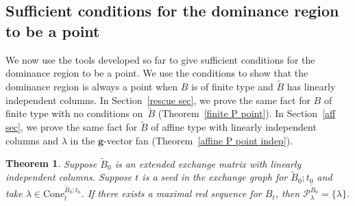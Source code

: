 \documentclass{amsart}
\newtheorem{theorem}[proposition]{Theorem}
\theoremstyle{definition}
\theoremstyle{remark}
\numberwithin{equation}{section}
\newcommand{\set}[1]{{\lbrace #1 \rbrace}}
\newcommand{\0}{{\mathbf{0}}}
\newcommand{\Cone}{\mathrm{Cone}}
\newcommand{\g}{\mathbf{g}}
\newcommand{\tB}{{\widetilde{B}}}
\renewcommand{\P}{\mathcal{P}}
\begin{document}
\subsection{Sufficient conditions for the dominance region to be a point}\label{point sec}  
We now use the tools developed so far to give sufficient conditions for the dominance region to be a point.
We use the conditions to show that the dominance region is always a point when $B$ is of finite type and $\tB$ has linearly independent columns.
In Section~\ref{rescue sec}, we prove the same fact for $B$ of finite type with no conditions on~$\tB$ (Theorem~\ref{finite P point}).
In Section~\ref{aff sec}, we prove the same fact for $\tB$ of affine type with linearly independent columns and $\lambda$ in the $\g$-vector fan (Theorem~\ref{affine P point indep}). 

\begin{theorem}\label{P point}  
Suppose $\tB_0$ is an extended exchange matrix with linearly independent columns.
Suppose $t$ is a seed in the exchange graph for $\tB_0;t_0$ and take $\lambda\in\Cone^{\tB_0;t_0}_t$.
If there exists a maximal red sequence for $B_t$, then $\P^{\tB_0}_\lambda=\set{\lambda}$.
\end{theorem}
\end{document}
